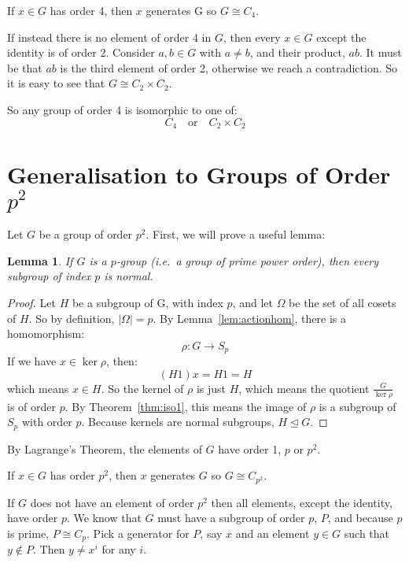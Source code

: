 \documentclass[a4paper, oneside, 12pt, final]{article}
\newtheorem{lemma}[theorem]{Lemma}
\theoremstyle{definition}
\newcommand{\nrmsgp}{\unlhd}
\begin{document}
If \(x \in G\) has order 4, then \(x\) generates G so \(G \cong C_4\).

If instead there is no element of order 4 in \(G\), then every \(x \in G\) except the identity is of
order 2.
Consider \(a, b \in G\) with \(a \neq b\), and their product, \(ab\).
It must be that \(ab\) is the third element of order 2, otherwise we reach a contradiction.
So it is easy to see that \(G \cong C_2 \times C_2\).

So any group of order 4 is isomorphic to one of:
\[C_4 \quad \text{or} \quad C_2 \times C_2\]

\section{Generalisation to Groups of Order \(p^2\)}
Let \(G\) be a group of order \(p^2\).
First, we will prove a useful lemma:

\begin{lemma}
    If \(G\) is a \(p\)-group (i.e.\ a group of prime power order), then every subgroup of index \(p\) is normal.
\end{lemma}

\begin{proof}
    Let \(H\) be a subgroup of G, with index \(p\), and let \(\Omega\) be the set of all cosets of \(H\).
    So by definition, \(|\Omega| = p\).
    By Lemma~\ref{lem:actionhom}, there is a homomorphism:
    \[\rho:G \to S_p\]
    If we have \(x \in \ker{\rho}\), then:
    \[(H1)x = H1 = H\]
    which means \(x \in H\).
    So the kernel of \(\rho\) is just \(H\), which means the quotient \(\frac{G}{\ker{\rho}}\) is of order \(p\).
    By Theorem~\ref{thm:iso1}, this means the image of \(\rho\) is a subgroup of \(S_p\) with order \(p\).
    Because kernels are normal subgroups, \(H \nrmsgp G\).  %
\end{proof}


By Lagrange's Theorem, the elements of \(G\) have order 1, \(p\) or \(p^2\).

If \(x \in G\) has order \(p^2\), then \(x\) generates \(G\) so \(G \cong C_{p^2}\).

If \(G\) does not have an element of order \(p^2\) then all elements, except the identity, have order \(p\).
We know that \(G\) must have a subgroup of order \(p\), \(P\), and because \(p\) is prime, \(P \cong C_p\).
Pick a generator for \(P\), say \(x\) and an element \(y \in G\) such that \(y \notin P\).
Then \(y \neq x^i\) for any \(i\).
\end{document}
